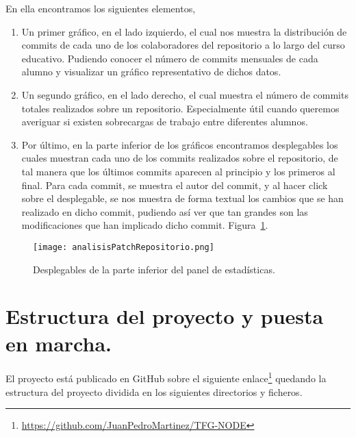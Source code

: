     En ella encontramos los siguientes elementos,
    \begin{enumerate}
      \item Un primer gráfico, en el lado izquierdo, el cual nos muestra la distribución de commits de cada uno de los colaboradores del repositorio a lo largo del curso educativo. Pudiendo conocer el número de commits mensuales de cada alumno y visualizar un gráfico representativo de dichos datos.
      \item Un segundo gráfico, en el lado derecho, el cual muestra el número de commits totales realizados sobre un repositorio. Especialmente útil cuando queremos averiguar si existen sobrecargas de trabajo entre diferentes alumnos.
      \item Por último, en la parte inferior de los gráficos encontramos desplegables los cuales muestran cada uno de los commits realizados sobre el repositorio, de tal manera que los últimos commits aparecen al principio y los primeros al final. Para cada commit, se muestra el autor del commit, y al hacer click sobre el desplegable, se nos muestra de forma textual los cambios que se han realizado en dicho commit, pudiendo así ver que tan grandes son las modificaciones que han implicado dicho commit. Figura~\ref{figure:imagenPatch}.
    \end{enumerate}

    \begin{figure}[h!]
      \texttt{[image: analisisPatchRepositorio.png]}
      \caption{Desplegables de la parte inferior del panel de estadísticas.}
      \label{figure:imagenPatch}
    \end{figure}

\chapter{Estructura del proyecto y puesta en marcha.\label{09EstructuraYpuesta}}

El proyecto está publicado en GitHub sobre el siguiente enlace\footnote{\url{https://github.com/JuanPedroMartinez/TFG-NODE}} quedando la estructura del proyecto dividida en los siguientes directorios y ficheros.

